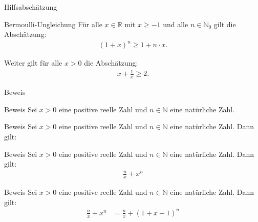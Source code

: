 \documentclass[10pt]{beamer}
\def\bN{\mathbb{N}}
\def\bR{\mathbb{R}}
\begin{document}
\begin{frame}{Hilfsabschätzung}
    \begin{block}{Bermoulli-Ungleichung}
        Für alle \( x \in \bR \) mit \( x \geq - 1 \) und alle \( n \in \bN_{0} \) gilt die Abschätzung:
        \begin{align*}
            \left( 1 + x \right)^{n}
            \geq 1 + n \cdot x.
        \end{align*}
    \end{block}
    Weiter gilt für alle \( x > 0 \) die Abschätzung:
    \begin{align*}
        x + \frac{1}{x} 
        \geq 2.
    \end{align*}
\end{frame}



\begin{frame}{Beweis}
    
\end{frame}



\begin{frame}{Beweis}
    Sei \( x > 0 \) eine positive reelle Zahl und \( n \in \bN \) eine natürliche Zahl.
\end{frame}



\begin{frame}{Beweis}
    Sei \( x > 0 \) eine positive reelle Zahl und \( n \in \bN \) eine natürliche Zahl. Dann gilt:
\end{frame}



\begin{frame}{Beweis}
    Sei \( x > 0 \) eine positive reelle Zahl und \( n \in \bN \) eine natürliche Zahl. Dann gilt:
    \begin{align*}
        \frac{n}{x} + x^{n}
    \end{align*}
\end{frame}



\begin{frame}{Beweis}
    Sei \( x > 0 \) eine positive reelle Zahl und \( n \in \bN \) eine natürliche Zahl. Dann gilt:
    \begin{align*}
        \frac{n}{x} + x^{n}
        & = \frac{n}{x} + \left(1 + x - 1 \right)^{n}
    \end{align*}
\end{frame}
\end{document}

